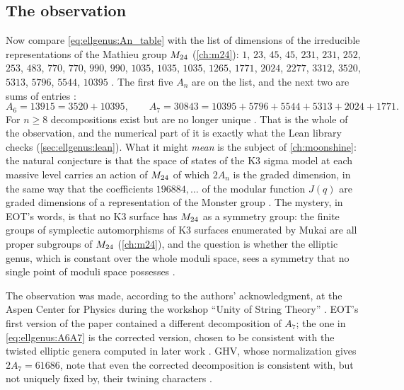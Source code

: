 \subsection{The observation}

Now compare \eqref{eq:ellgenus:An_table} with the list of dimensions of the irreducible
representations of the Mathieu group $M_{24}$ (\cref{ch:m24}): $1$, $23$, $45$, $45$, $231$,
$231$, $252$, $253$, $483$, $770$, $770$, $990$, $990$, $1035$, $1035$, $1035$, $1265$,
$1771$, $2024$, $2277$, $3312$, $3520$, $5313$, $5796$, $5544$, $10395$
. The first five $A_n$ are on the list, and the next two
are sums of entries :
\begin{equation}\label{eq:ellgenus:A6A7}
 A_6=13915=3520+10395,\qquad A_7=30843=10395+5796+5544+5313+2024+1771 .
\end{equation}
For $n\ge8$ decompositions exist but are no longer unique .
That is the whole of the observation, and the numerical part of it is exactly what the Lean
library checks (\cref{sec:ellgenus:lean}). What it might \emph{mean} is the subject of
\cref{ch:moonshine}: the natural conjecture is that the space of states of the K3 sigma
model at each massive level carries an action of $M_{24}$ of which $2A_n$ is the graded
dimension, in the same way that the coefficients $196884,\dots$ of the modular function
$J(q)$ are graded dimensions of a representation of the Monster group
. The mystery, in EOT's words, is that no K3
surface has $M_{24}$ as a symmetry group: the finite groups of symplectic automorphisms of K3
surfaces enumerated by Mukai are all proper subgroups of $M_{24}$ (\cref{ch:m24}), and the
question is whether the elliptic genus, which is constant over the whole moduli space, sees
a symmetry that no single point of moduli space possesses .

\begin{historybox}
The observation was made, according to the authors' acknowledgment, at the Aspen Center for
Physics during the workshop ``Unity of String Theory'' . EOT's
first version of the paper contained a different decomposition of $A_7$; the one in
\eqref{eq:ellgenus:A6A7} is the corrected version, chosen to be consistent with the
twisted elliptic genera computed in later work .
GHV, whose normalization gives $2A_7=61686$, note that even the corrected decomposition is
consistent with, but not uniquely fixed by, their twining characters
.
\end{historybox}

